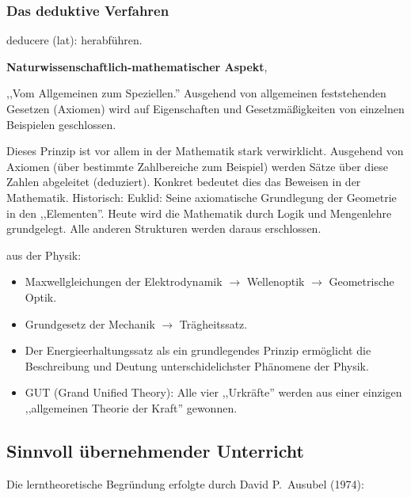 \subsubsection{Das deduktive Verfahren}

deducere (lat): herabf\"{u}hren.

\mip
{\bf Naturwissenschaftlich-mathematischer Aspekt},

,,Vom Allgemeinen zum Speziellen.''
Ausgehend von allgemeinen feststehenden Gesetzen (Axiomen)
wird auf Eigenschaften und Gesetzm\"{a}{\ss}igkeiten von einzelnen
Beispielen geschlossen.

\bip
Dieses Prinzip ist vor allem in der Mathematik stark verwirklicht.
Ausgehend von Axiomen (\"{u}ber bestimmte Zahlbereiche zum Beispiel)
werden S\"{a}tze \"{u}ber diese Zahlen abgeleitet (deduziert).
Konkret bedeutet dies das Beweisen in der Mathematik.
\mip
Historisch: Euklid: Seine axiomatische Grundlegung der Geometrie in den
,,Elementen''.
\mip
Heute wird die Mathematik durch Logik und Mengenlehre grundgelegt.
Alle anderen Strukturen werden daraus erschlossen.

\begin{beisp}
aus der Physik:
	\begin{itemize}
\item Maxwellgleichungen der Elektrodynamik
             $\to$ Wellenoptik $\to$ Geometrische Optik.
\item Grundgesetz der Mechanik $\to$ Tr\"{a}gheitssatz.
\item Der Energieerhaltungssatz als ein grundlegendes Prinzip erm\"{o}glicht
die Beschreibung und Deutung unterschidelichster Ph\"{a}nomene der Physik.
\item GUT (Grand Unified Theory):
Alle vier ,,Urkr\"{a}fte'' werden aus einer
einzigen ,,allgemeinen Theorie der Kraft'' gewonnen.
\end{itemize}
\end{beisp}


\bip\bip
\subsection{Sinnvoll \"{u}bernehmender Unterricht}

Die lerntheoretische Begr\"{u}ndung erfolgte durch
David P.\ Ausubel (1974):

